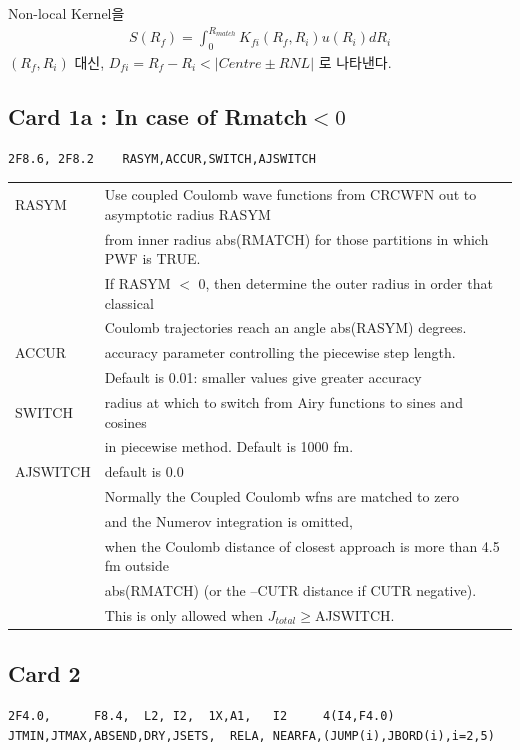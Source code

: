 \documentclass[11pt]{book}
\newcommand{\bea}{\begin{eqnarray}}
\newcommand{\eea}{\end{eqnarray}}
\begin{document}
Non-local Kernel을
\bea 
S(R_f)=\int_{0}^{R_{match}} K_{fi}(R_f,R_i) u(R_i) dR_i
\eea 
$(R_f,R_i)$ 대신, $D_{fi}=R_f-R_i< |Centre\pm RNL|$ 로 나타낸다.  
\subsection{Card 1a : In case of Rmatch$<0$}
\begin{verbatim}
2F8.6, 2F8.2    RASYM,ACCUR,SWITCH,AJSWITCH
\end{verbatim}

\begin{table}[h]
\begin{tabular}{|l|l|}
\hline 
RASYM & Use coupled Coulomb wave functions from CRCWFN out to asymptotic radius RASYM \\
      & from inner radius abs(RMATCH) for those partitions in which PWF is TRUE.\\
      & If RASYM $<$ 0, then determine the outer radius in order that classical \\
      & Coulomb trajectories reach an angle abs(RASYM) degrees. \\ \hline 
ACCUR & accuracy parameter controlling the piecewise step length. \\
      & Default is 0.01: smaller values give greater accuracy \\ \hline 
SWITCH & radius at which to switch from Airy functions to sines and cosines \\
       & in piecewise method.  Default is 1000 fm. \\ \hline 
AJSWITCH & default is 0.0 \\
       &  Normally the Coupled Coulomb wfns are matched to zero \\
       & and the Numerov integration is omitted, \\
       & when the Coulomb distance of closest approach is more than 4.5 fm outside \\
       & abs(RMATCH) (or  the  --CUTR distance if   CUTR negative). \\
       & This is only allowed when $J_{total} \geq $AJSWITCH. \\
\hline 
\end{tabular} 
\end{table} 

\subsection{Card 2}
\begin{verbatim}
2F4.0,      F8.4,  L2, I2,  1X,A1,   I2     4(I4,F4.0)
JTMIN,JTMAX,ABSEND,DRY,JSETS,  RELA, NEARFA,(JUMP(i),JBORD(i),i=2,5)
\end{verbatim}
\end{document}
